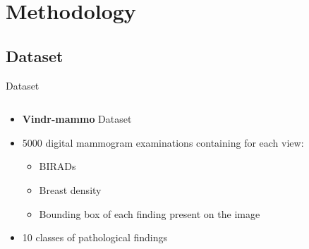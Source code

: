 \section{Methodology}


\subsection{Dataset}
\begin{frame}{Dataset}
    \begin{columns}
        \begin{column}{0.5\textwidth}
            \begin{itemize}
                \item \textbf{Vindr-mammo} Dataset 
                \item 5000 digital mammogram examinations containing for each view:
                \begin{itemize}
                    \item BIRADs
                    \item Breast density
                    \item Bounding box of each finding present on the image
                \end{itemize}
                \item 10 classes of pathological findings
            \end{itemize}
        \end{column}


\end{columns}
\end{frame}
